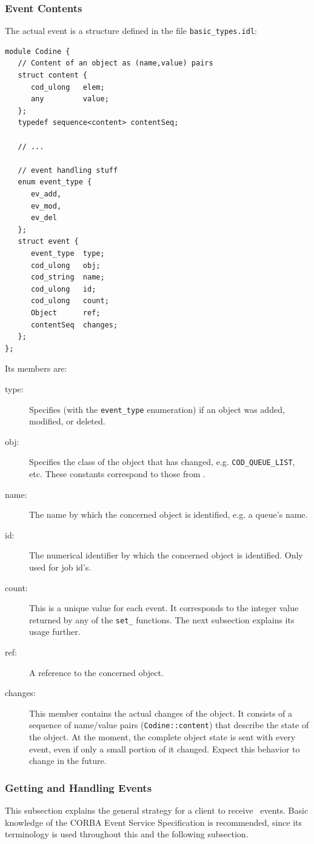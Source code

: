 \subsubsection{Event Contents}
The actual event is a structure defined in the file
\texttt{basic\_types.idl}:
\begin{Verbatim}[fontsize=\small, frame=single]
module Codine {
   // Content of an object as (name,value) pairs
   struct content {
      cod_ulong   elem;
      any         value;
   };
   typedef sequence<content> contentSeq;

   // ...

   // event handling stuff
   enum event_type {
      ev_add,
      ev_mod,
      ev_del
   };
   struct event {
      event_type  type;
      cod_ulong   obj;
      cod_string  name;
      cod_ulong   id;
      cod_ulong   count;
      Object      ref;
      contentSeq  changes;
   };
};
\end{Verbatim}
Its members are:
\begin{description}
\item[type:] Specifies (with the \texttt{event\_type} enumeration) if an
object was added, modified, or deleted.
\item[obj:] Specifies the class of the object that has changed, e.g.
\texttt{COD\_QUEUE\_LIST}, etc. These constants correspond to those from
\codapi.
\item[name:] The name by which the concerned object is identified, e.g. a
queue's name.
\item[id:] The numerical identifier by which the concerned object is
identified. Only used for job id's.
\item[count:] This is a unique value for each event. It corresponds to the
integer value returned by any of the \texttt{set\_} functions. The next
subsection explains its usage further.
\item[ref:] A reference to the concerned object.
\item[changes:] This member contains the actual changes of the object. It
consists of a sequence of name/value pairs (\texttt{Codine::content}) that
describe the state of the object. At the moment, the complete object state is
sent with every event, even if only a small portion of it changed. Expect
this behavior to change in the future.
\end{description}

\subsubsection{Getting and Handling Events}
This subsection explains the general strategy for a client to receive \qidl\
events. Basic knowledge of the CORBA Event Service Specification is
recommended, since its terminology is used throughout this and the following
subsection.

